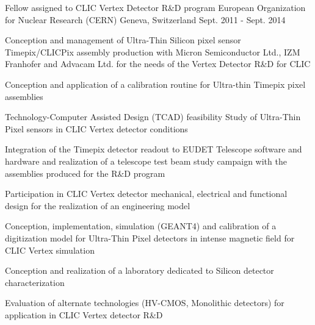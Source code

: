 \begin{cventries}
  \cventry
    {Fellow assigned to CLIC Vertex Detector R\&D program} %
    {European Organization for Nuclear Research (CERN)} %
    {Geneva, Switzerland} %
    {Sept. 2011 - Sept. 2014} %
    {
      \begin{cvitems} %
        \item Conception and management of Ultra-Thin Silicon pixel sensor Timepix/CLICPix assembly production with Micron Semiconductor Ltd., IZM Franhofer and Advacam Ltd. for the needs of the Vertex Detector R\&D for CLIC
        \item Conception and application of a calibration routine for Ultra-thin Timepix pixel assemblies
        \item Technology-Computer Assisted Design (TCAD) feasibility Study of Ultra-Thin Pixel sensors in CLIC Vertex detector conditions
        \item Integration of the Timepix detector readout to EUDET Telescope software and hardware and realization of a telescope test beam study campaign with the assemblies produced for the R\&D program
        \item Participation in CLIC Vertex detector mechanical, electrical and functional design for the realization of an engineering model 
        \item Conception, implementation, simulation (GEANT4) and calibration of a digitization model for Ultra-Thin Pixel detectors in intense magnetic field for CLIC Vertex simulation
        \item Conception and realization of a laboratory dedicated to Silicon detector characterization
        \item Evaluation of alternate technologies (HV-CMOS, Monolithic detectors) for application in CLIC Vertex detector R\&D
      \end{cvitems}
    }


\end{cventries}
